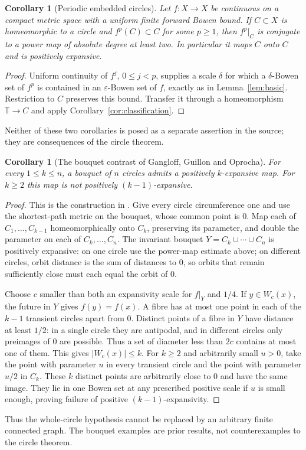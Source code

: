 \documentclass[11pt]{article}
\newtheorem{corollary}[theorem]{Corollary}
\newcommand{\T}{\mathbb T}
\begin{document}
\begin{corollary}[Periodic embedded circles]\label{cor:embedded}
Let $f:X\to X$ be continuous on a compact metric space with a uniform
finite forward Bowen bound. If $C\subset X$ is homeomorphic to a circle
and $f^p(C)\subset C$ for some $p\ge1$, then $f^p|_C$ is conjugate to
a power map of absolute degree at least two. In particular it maps $C$
onto $C$ and is positively expansive.
\end{corollary}
\begin{proof}
Uniform continuity of $f^j$, $0\le j<p$, supplies a scale $\delta$ for
which a $\delta$-Bowen set of $f^p$ is contained in an
$\varepsilon$-Bowen set of $f$, exactly as in Lemma~\ref{lem:basic}.
Restriction to $C$ preserves this bound. Transfer it through a
homeomorphism $\T\to C$ and apply Corollary~\ref{cor:classification}.
\end{proof}
Neither of these two corollaries is posed as a separate assertion in the
source; they are consequences of the circle theorem.

\begin{corollary}[The bouquet contrast of Gangloff, Guillon and Oprocha]
\label{cor:bouquet}
For every $1\le k\le n$, a bouquet of $n$ circles admits a positively
$k$-expansive map. For $k\ge2$ this map is not positively $(k-1)$-expansive.
\end{corollary}
\begin{proof}
This is the construction in \cite[Remark 3.10, Section 3.2, p.~9]{GGO}.
Give every circle circumference one and use the shortest-path metric on
the bouquet, whose common point is $0$. Map each of $C_1,\ldots,C_{k-1}$
homeomorphically onto $C_k$, preserving its parameter, and double the
parameter on each of $C_k,\ldots,C_n$.
The invariant bouquet $Y=C_k\cup\cdots\cup C_n$ is positively expansive:
on one circle use the power-map estimate above; on different circles,
orbit distance is the sum of distances to $0$, so orbits that remain
sufficiently close must each equal the orbit of $0$.

Choose $c$ smaller than both an expansivity scale for $f|_Y$ and $1/4$.
If $y\in W_c(x)$, the future in $Y$ gives $f(y)=f(x)$.
A fibre has at most one point in each of the $k-1$ transient circles
apart from $0$. Distinct points of a fibre in $Y$ have distance at least
$1/2$: in a single circle they are antipodal, and in different circles
only preimages of $0$ are possible. Thus a set of diameter less than
$2c$ contains at most one of them. This gives $|W_c(x)|\le k$.
For $k\ge2$ and arbitrarily small $u>0$, take the point with parameter
$u$ in every transient circle and the point with parameter $u/2$ in $C_k$.
These $k$ distinct points are arbitrarily close to $0$ and have the same
image. They lie in one Bowen set at any prescribed positive scale if $u$
is small enough, proving failure of positive $(k-1)$-expansivity.
\end{proof}
Thus the whole-circle hypothesis cannot be replaced by an arbitrary
finite connected graph. The bouquet examples are prior results, not
counterexamples to the circle theorem.
\end{document}
